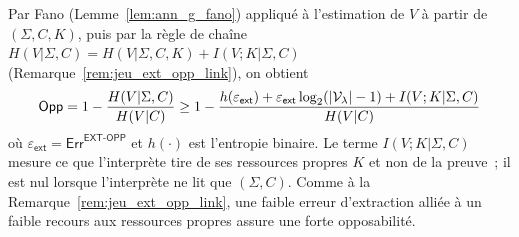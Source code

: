 \begin{sloppypar}
\begin{remark}
\label{rem:ann_ext_opp_link}
Par Fano (Lemme~\ref{lem:ann_g_fano}) appliqu\'e \`a l'estimation de $V$ \`a
partir de $(\Sigma,C,K)$, puis par la r\`egle de cha\^ine
$H(V|\Sigma,C) = H(V|\Sigma,C,K) + I(V;K|\Sigma,C)$
(Remarque~\ref{rem:jeu_ext_opp_link}), on obtient
\begin{equation}
\mathsf{Opp} = 1 - \frac{H(V|\Sigma,C)}{H(V|C)}
\geq 1 - \frac{h(\varepsilon_{\mathsf{ext}})
  + \varepsilon_{\mathsf{ext}}\log_2(|\mathcal{V}_\lambda|-1)
  + I(V;K|\Sigma,C)}
  {H(V|C)}
\label{eq:ann_fano_opp}
\end{equation}
o\`u $\varepsilon_{\mathsf{ext}} = \mathsf{Err}^{\mathsf{EXT\text{-}OPP}}$
et $h(\cdot)$ est l'entropie binaire. Le terme $I(V;K|\Sigma,C)$ mesure ce que
l'interpr\`ete tire de ses ressources propres $K$ et non de la preuve~; il est nul
lorsque l'interpr\`ete ne lit que $(\Sigma,C)$.
Comme \`a la Remarque~\ref{rem:jeu_ext_opp_link}, une faible erreur d'extraction alli\'ee \`a un faible recours aux ressources propres
assure une forte opposabilit\'e.
\end{remark}
\end{sloppypar}

